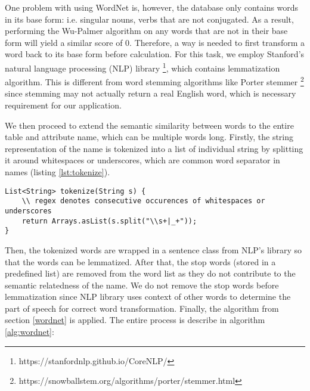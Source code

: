 One problem with using WordNet is, however, the database only contains words in its base form: i.e. singular nouns, verbs that are not conjugated. As a result, performing the Wu-Palmer algorithm on any words that are not in their base form will yield a similar score of 0. Therefore, a way is needed to first transform a word back to its base form before calculation. For this task, we employ Stanford's natural language processing (NLP) library \footnote{https://stanfordnlp.github.io/CoreNLP/}, which contains lemmatization algorithm. This is different from word stemming algorithms like Porter stemmer \footnote{https://snowballstem.org/algorithms/porter/stemmer.html} since stemming may not actually return a real English word, which is necessary requirement for our application.

We then proceed to extend the semantic similarity between words to the entire table and attribute name, which can be multiple words long. Firstly, the string representation of the name is tokenized into a list of individual string by splitting it around whitespaces or underscores, which are common word separator in names (listing \ref{lst:tokenize}).

\begin{lstlisting}[caption=tokenize() method, label=lst:tokenize]
List<String> tokenize(String s) {
    \\ regex denotes consecutive occurences of whitespaces or underscores
    return Arrays.asList(s.split("\\s+|_+"));
}
\end{lstlisting}

Then, the tokenized words are wrapped in a sentence class from NLP's library so that the words can be lemmatized. After that, the stop words (stored in a predefined list) are removed from the word list as they do not contribute to the semantic relatedness of the name. We do not remove the stop words before lemmatization since NLP library uses context of other words to determine the part of speech for correct word transformation. Finally, the algorithm from section \ref{wordnet} is applied. The entire process is describe in algorithm \ref{alg:wordnet}:

